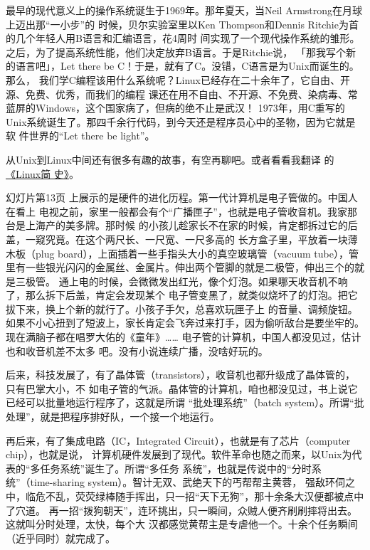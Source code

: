 \documentclass{wx672ctexart}
\newcommand\mpic[1]{%
  \marginpar{\texttt{[image: thumbnails/\#1]}}}
\begin{document}
最早的现代意义上的操作系统诞生于1969年。那年夏天，当Neil Armstrong在月球上迈出那“一小步”的
时候，贝尔实验室里以Ken Thompson和Dennis Ritchie为首的几个年轻人用B语言和汇编语言，花4周时
间实现了一个现代操作系统的雏形。之后，为了提高系统性能，他们决定放弃B语言。于是Ritchie说，
「那我写个新的语言吧」，Let there be C！于是，就有了C。没错，C语言是为Unix而诞生的。那么，
我们学C编程该用什么系统呢？Linux已经存在二十余年了，它自由、开源、免费、优秀，而我们的编程
课还在用不自由、不开源、不免费、染病毒、常蓝屏的Windows，这个国家病了，但病的绝不止是武汉！
1973年，用C重写的Unix系统诞生了。那四千余行代码，到今天还是程序员心中的圣物，因为它就是软
件世界的“Let there be light”。

从Unix到Linux中间还有很多有趣的故事，有空再聊吧。或者看看我翻译
的\href{https://cs6.swfu.edu.cn/\~wx672/lecture\_notes/linux/linux\_history/}{《Linux简
  史》}。

\label{sec:org1ad1b10}
幻灯片第13页\mpic{pg_0013}上展示的是硬件的进化历程。第一代计算机是电子管做的。中国人在看上
电视之前，家里一般都会有个“广播匣子”，也就是电子管收音机。我家那台是上海产的美多牌。那时候
的小孩儿趁家长不在家的时候，肯定都拆过它的后盖，一窥究竟。在这个两尺长、一尺宽、一尺多高的
长方盒子里，平放着一块薄木板（plug board），上面插着一些手指头大小的真空玻璃管（vacuum
tube），管里有一些银光闪闪的金属丝、金属片。伸出两个管脚的就是二极管，伸出三个的就是三极管。
通上电的时候，会微微发出红光，像个灯泡。如果哪天收音机不响了，那么拆下后盖，肯定会发现某个
电子管变黑了，就类似烧坏了的灯泡。把它拔下来，换上个新的就行了。小孩子手欠，总喜欢玩匣子上
的音量、调频旋钮。如果不小心扭到了短波上，家长肯定会飞奔过来打手，因为偷听敌台是要坐牢的。
现在满脑子都在唱罗大佑的《童年》……  电子管的计算机，中国人都没见过，估计也和收音机差不太多
吧。没有小说连续广播，没啥好玩的。

后来，科技发展了，有了晶体管（transistors），收音机也都升级成了晶体管的，只有巴掌大小，不
如电子管的气派。晶体管的计算机，咱也都没见过，书上说它已经可以批量地运行程序了，这就是所谓
“批处理系统”（batch system）。所谓“批处理”，就是把程序排好队，一个接一个地运行。

再后来，有了集成电路（IC，Integrated Circuit），也就是有了芯片（computer chip），也就是说，
计算机硬件发展到了现代。软件革命也随之而来，以Unix为代表的“多任务系统”诞生了。所谓“多任务
系统”，也就是传说中的“分时系统”（time-sharing system）。智计无双、武绝天下的丐帮帮主黄蓉，
强敌环伺之中，临危不乱，荧荧绿棒随手挥出，只一招“天下无狗”，那十余条大汉便都被点中了穴道。
再一招“拨狗朝天”，连环挑出，只一瞬间，众贼人便齐刷刷摔将出去。这就叫分时处理，太快，每个大
汉都感觉黄帮主是专虐他一个。十余个任务瞬间（近乎同时）就完成了。
\end{document}
